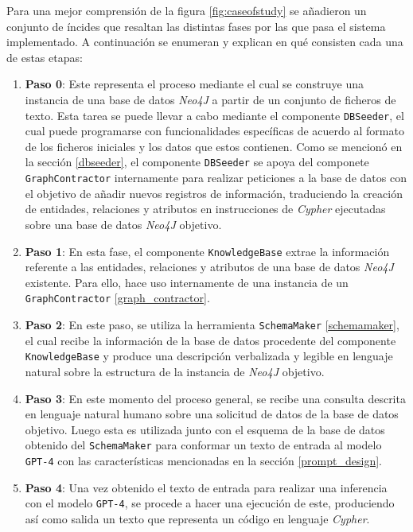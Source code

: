 Para una mejor comprensión de la figura \ref{fig:caseofstudy} se añadieron un conjunto de íncides que resaltan las distintas fases por las que pasa el sistema implementado. A continuación se enumeran y explican en qué consisten cada una de estas etapas:

\begin{enumerate}

\item \textbf{Paso 0}: Este representa el proceso mediante el cual se construye una instancia de una base de datos \textit{Neo4J}  a partir de un conjunto de ficheros de texto. Esta tarea se puede llevar a cabo mediante el componente \texttt{DBSeeder}, el cual puede programarse con funcionalidades específicas de acuerdo al formato de los ficheros iniciales y los datos que estos contienen. Como se mencionó en la sección \ref{dbseeder}, el componente \texttt{DBSeeder} se apoya del componete \texttt{GraphContractor} internamente para realizar peticiones a la base de datos con el objetivo de añadir nuevos registros de información, traduciendo la creación de entidades, relaciones y atributos en instrucciones de \textit{Cypher} ejecutadas sobre una base de datos \textit{Neo4J} objetivo.

\item \textbf{Paso 1}: En esta fase, el componente \texttt{KnowledgeBase} extrae la información referente a las entidades, relaciones y atributos de una base de datos \textit{Neo4J} existente. Para ello, hace uso internamente de una instancia de un \texttt{GraphContractor} \ref{graph_contractor}.

\item \textbf{Paso 2}: En este paso, se utiliza la herramienta \texttt{SchemaMaker} \ref{schemamaker}, el cual recibe la información de la base de datos procedente del componente \texttt{KnowledgeBase} y produce una descripción verbalizada y legible en lenguaje natural sobre la estructura de la instancia de \textit{Neo4J} objetivo.

\item \textbf{Paso 3}: En este momento del proceso general, se recibe una consulta descrita en lenguaje natural humano sobre una solicitud de datos de la base de datos objetivo. Luego esta es utilizada junto con el esquema de la base de datos obtenido del \texttt{SchemaMaker}  para conformar un texto de entrada al modelo \texttt{GPT-4} con las características mencionadas en la sección \ref{prompt_design}.

\item \textbf{Paso 4}: Una vez obtenido el texto de entrada para realizar una inferencia con el modelo \texttt{GPT-4}, se procede a hacer una ejecución de este, produciendo así como salida un texto que representa un código en lenguaje \textit{Cypher}.


\end{enumerate}
